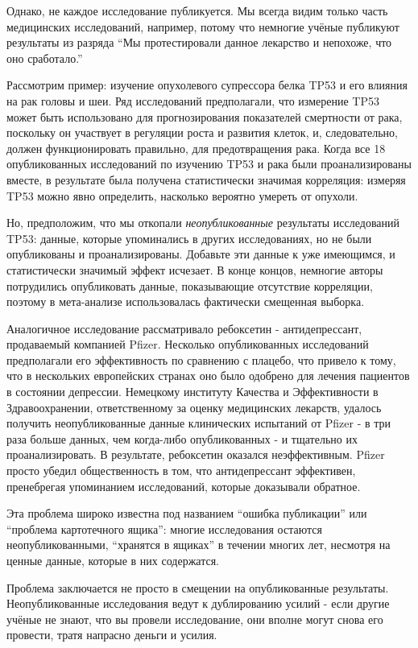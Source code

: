 Однако, не каждое исследование публикуется. Мы всегда видим только часть медицинских исследований, например, потому что немногие учёные публикуют результаты из разряда ``Мы протестировали данное лекарство и непохоже, что оно сработало.''

Рассмотрим пример: изучение опухолевого супрессора белка TP53 и его влияния на рак головы и шеи. Ряд исследований предполагали, что измерение TP53 может быть использовано для прогнозирования показателей смертности от рака, поскольку он участвует в регуляции роста и развития клеток, и, следовательно, должен функционировать правильно, для предотвращения рака. Когда все 18 опубликованных исследований по изучению TP53 и рака были проанализированы вместе, в результате была получена статистически значимая корреляция: измеряя TP53 можно явно определить, насколько вероятно умереть от опухоли.

Но, предположим, что мы откопали \emph{неопубликованные} результаты исследований TP53: данные, которые упоминались в других исследованиях, но не были опубликованы и проанализированы. Добавьте эти данные к уже имеющимся, и статистически значимый эффект исчезает. \cite{kyzas_selective_2005} В конце концов, немногие авторы потрудились опубликовать данные, показывающие отсутствие корреляции, поэтому в мета-анализе использовалась фактически смещенная выборка. 

Аналогичное исследование рассматривало ребоксетин - антидепрессант, продаваемый компанией Pfizer. Несколько опубликованных исследований предполагали его эффективность по сравнению с плацебо, что привело к тому, что в нескольких европейских странах оно было одобрено для лечения пациентов в состоянии депрессии. Немецкому институту Качества и Эффективности в Здравоохранении, ответственному за оценку медицинских лекарств, удалось получить неопубликованные данные клинических испытаний от Pfizer - в три раза больше данных, чем когда-либо опубликованных - и тщательно их проанализировать. В результате, ребоксетин оказался неэффективным. Pfizer просто убедил общественность в том, что антидепрессант эффективен, пренебрегая упоминанием исследований, которые доказывали обратное. \cite{eyding_reboxetine_2010}

Эта проблема широко известна под названием ``ошибка публикации'' или ``проблема картотечного ящика'': многие исследования остаются неопубликованными, ``хранятся в ящиках'' в течении многих лет, несмотря на ценные данные, которые в них содержатся.

Проблема заключается не просто в смещении на опубликованные результаты. Неопубликованные исследования ведут к дублированию усилий - если другие учёные не знают, что вы провели исследование, они вполне могут снова его провести, тратя напрасно деньги и усилия. 

